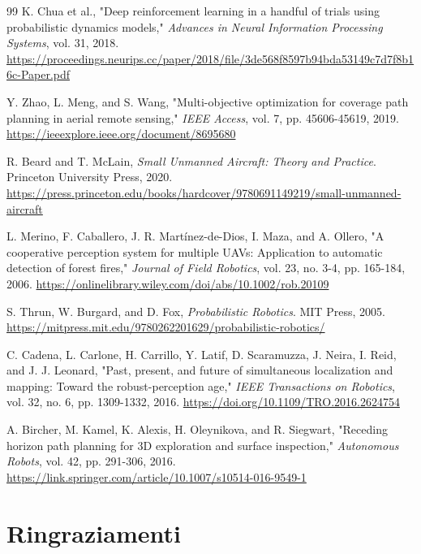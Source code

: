 \documentclass[twoside]{article}
\begin{document}
\begin{thebibliography}{99}
 K. Chua et al., "Deep reinforcement learning in a handful of trials using probabilistic dynamics models," \textit{Advances in Neural Information Processing Systems}, vol. 31, 2018. \url{https://proceedings.neurips.cc/paper/2018/file/3de568f8597b94bda53149c7d7f8b16c-Paper.pdf}

 Y. Zhao, L. Meng, and S. Wang, "Multi-objective optimization for coverage path planning in aerial remote sensing," \textit{IEEE Access}, vol. 7, pp. 45606-45619, 2019. \url{https://ieeexplore.ieee.org/document/8695680}

 R. Beard and T. McLain, \textit{Small Unmanned Aircraft: Theory and Practice}. Princeton University Press, 2020. \url{https://press.princeton.edu/books/hardcover/9780691149219/small-unmanned-aircraft}

 L. Merino, F. Caballero, J. R. Martínez-de-Dios, I. Maza, and A. Ollero, "A cooperative perception system for multiple UAVs: Application to automatic detection of forest fires," \textit{Journal of Field Robotics}, vol. 23, no. 3-4, pp. 165-184, 2006. \url{https://onlinelibrary.wiley.com/doi/abs/10.1002/rob.20109}

 S. Thrun, W. Burgard, and D. Fox, \textit{Probabilistic Robotics}. MIT Press, 2005. \url{https://mitpress.mit.edu/9780262201629/probabilistic-robotics/}

 C. Cadena, L. Carlone, H. Carrillo, Y. Latif, D. Scaramuzza, J. Neira, I. Reid, and J. J. Leonard, "Past, present, and future of simultaneous localization and mapping: Toward the robust-perception age," \textit{IEEE Transactions on Robotics}, vol. 32, no. 6, pp. 1309-1332, 2016. \url{https://doi.org/10.1109/TRO.2016.2624754}

 A. Bircher, M. Kamel, K. Alexis, H. Oleynikova, and R. Siegwart, "Receding horizon path planning for 3D exploration and surface inspection," \textit{Autonomous Robots}, vol. 42, pp. 291-306, 2016. \url{https://link.springer.com/article/10.1007/s10514-016-9549-1}

\end{thebibliography}


\newpage
{}
\section*{\LARGE Ringraziamenti}
\end{document}
